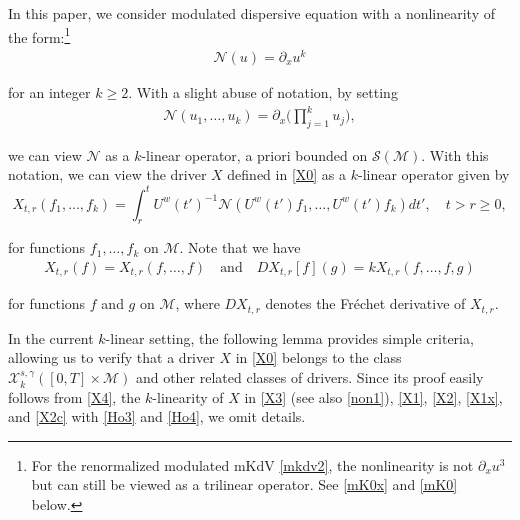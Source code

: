 \documentclass[letterpaper, 11pt,  reqno]{amsart}
\newcommand{\1}{\hspace{0.5mm}\text{I}\hspace{0.5mm}}
\newcommand{\noi}{\noindent}
\newcommand{\g}{\gamma}
\newcommand{\dx}{\partial_x}
\renewcommand{\S}{\mathcal{S}}
\newcommand{\M}{\mathcal{M}}
\newcommand{\NN}{\mathcal{N}}
\newcommand{\cX}{\mathcal{X}}
\newcommand{\uw}{U^w}
\numberwithin{equation}{section}
\numberwithin{theorem}{section}
\begin{document}
In this paper, we consider modulated dispersive equation 
with a nonlinearity 
of the form:\footnote{For the renormalized modulated mKdV \eqref{mkdv2}, the nonlinearity is not $\dx u^3$ but can still be viewed as a trilinear operator.
See \eqref{mK0x} and \eqref{mK0} below.}
\begin{align}
\NN(u) = \dx u^k
\label{non0}
\end{align}

\noi
for  an integer $k \ge 2 $.
With a slight abuse of notation, by setting
\begin{align}
\NN(u_1, \dots, u_k) = \dx \bigg(\prod_{j = 1}^k u_j\bigg), 
\label{non1}
\end{align}

\noi
we can view $\NN$ as a $k$-linear operator, 
a priori bounded on $\S(\M)$.
With this notation,  we can view the driver $X$ defined in \eqref{X0}
as a $k$-linear operator given by 
\begin{equation}
X_{t,r}(f_1, \dots, f_k) = \int_r^t \uw(t')^{-1} \NN(\uw(t') f_1, \dots, \uw(t') f_k) dt', \quad 
t > r \ge 0, 
\label{X3}
\end{equation}

\noi
for functions $f_1, \dots, f_k$ on $\M$.
Note that we have 
\begin{align}
X_{t, r}(f) = X_{t, r}(f, \dots, f)
\quad \text{and}\quad
DX_{t, r}[f] (g) = k X_{t, r}(f, \dots, f, g)
\label{X4}
\end{align}


\noi
for functions $f$ and $g$ on $\M$, 
where $DX_{t, r}$ denotes the  Fr\'echet derivative of $X_{t, r}$.



\medskip







In the current $k$-linear setting, 
the following lemma
provides  simple criteria, 
allowing us to  verify that 
a driver $X$ in \eqref{X0} belongs to 
the class
 $\cX^{s, \g}_k([0, T]\times \M)$
and other related classes of drivers.
Since its proof easily follows
 from 
 \eqref{X4}, 
 the $k$-linearity of $X$ in \eqref{X3}
 (see also \eqref{non1}), 
  \eqref{X1}, \eqref{X2}, \eqref{X1x}, and \eqref{X2c}
with 
\eqref{Ho3} and \eqref{Ho4}, 
 we omit details.
\end{document}
